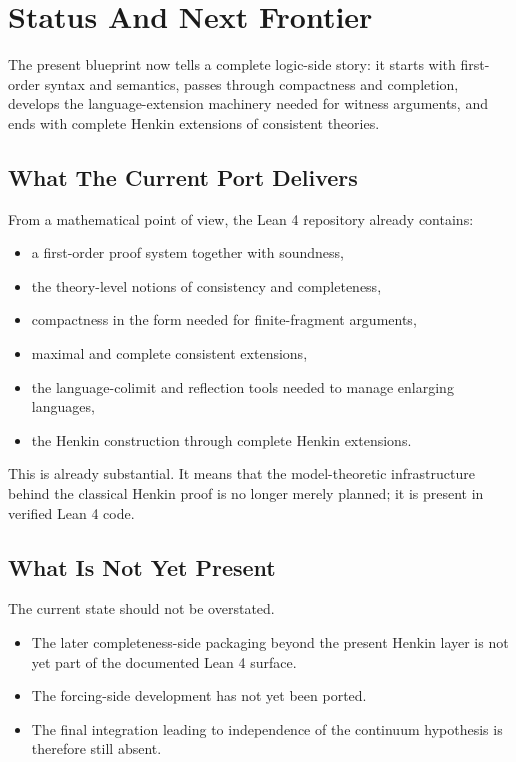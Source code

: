\chapter{Status And Next Frontier}
\label{chap:status-next-frontier}

The present blueprint now tells a complete logic-side story: it starts with
first-order syntax and semantics, passes through compactness and completion,
develops the language-extension machinery needed for witness arguments, and
ends with complete Henkin extensions of consistent theories.

\section{What The Current Port Delivers}

From a mathematical point of view, the Lean 4 repository already contains:
\begin{itemize}
\item a first-order proof system together with soundness,
\item the theory-level notions of consistency and completeness,
\item compactness in the form needed for finite-fragment arguments,
\item maximal and complete consistent extensions,
\item the language-colimit and reflection tools needed to manage enlarging
languages,
\item the Henkin construction through complete Henkin extensions.
\end{itemize}

This is already substantial. It means that the model-theoretic infrastructure
behind the classical Henkin proof is no longer merely planned; it is present in
verified Lean 4 code.

\section{What Is Not Yet Present}

The current state should not be overstated.

\begin{itemize}
\item The later completeness-side packaging beyond the present Henkin layer is
not yet part of the documented Lean 4 surface.
\item The forcing-side development has not yet been ported.
\item The final integration leading to independence of the continuum hypothesis
is therefore still absent.
\end{itemize}

